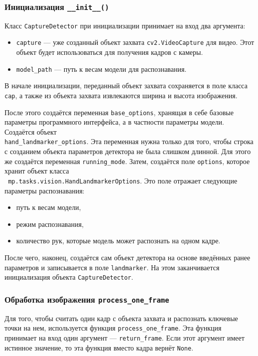 \documentclass[14pt, a4paper]{extarticle}
\begin{document}
\subsubsection{Инициализация \texttt{\_\_init\_\_()}}
Класс \texttt{CaptureDetector} при инициализации принимает на вход два аргумента:
\begin{itemize}
  \item \texttt{capture} --- уже созданный объект захвата
    \texttt{cv2.VideoCapture} для видео. Этот объект будет использоваться для
    получения кадров с камеры.
  \item \texttt{model\_path} --- путь к весам модели для распознавания.
\end{itemize}

В начале инициализации, переданный объект захвата сохраняется в поле класса
\texttt{cap}, а также из объекта захвата извлекаются ширина и высота изображения.

После этого создаётся переменная \texttt{base\_options}, хранящая в себе
базовые параметры программного интерфейса, а в частности параметры модели.
Создаётся объект \\\texttt{hand\_landmarker\_options}. Эта переменная нужна
только для того, чтобы строка с созданием объекта параметров детектора не была слишком
длинной. Для этого же создаётся переменная \texttt{running\_mode}.
Затем, создаётся поле \texttt{options}, которое хранит объект класса 
\\\texttt{ mp.tasks.vision.HandLandmarkerOptions}. Это поле отражает следующие
параметры распознавания:
\begin{itemize}
  \item путь к весам модели,
  \item режим распознавания,
  \item количество рук, которые модель может распознать на одном кадре.
\end{itemize}
После чего, наконец, создаётся сам объект детектора на основе введённых ранее
параметров и записывается в поле \texttt{landmarker}.
На этом заканчивается инициализация объекта \texttt{CaptureDetector}.

\subsubsection{Обработка изображения \texttt{process\_one\_frame}}
Для того, чтобы считать один кадр с объекта захвата и распознать ключевые
точки на нем, используется функция
\texttt{process\_one\_frame}.
Эта функция принимает на вход один аргумент --- \texttt{return\_frame}. Если
этот аргумент имеет истинное значение, то эта функция вместо кадра вернёт
\texttt{None}.
\end{document}
